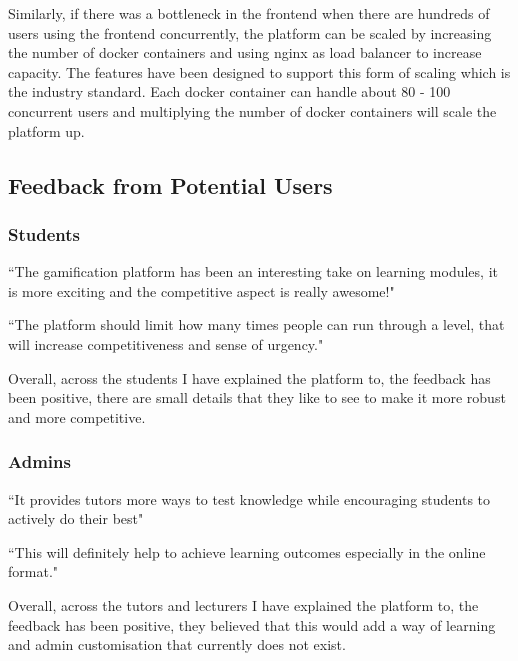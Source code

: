 Similarly, if there was a bottleneck in the frontend when there are hundreds of users using the frontend concurrently, the platform can be scaled by increasing the number of docker containers and using nginx as load balancer to increase capacity. The features have been designed to support this form of scaling which is the industry standard. Each docker container can handle about 80 - 100 concurrent users and multiplying the number of docker containers will scale the platform up.

\subsection{Feedback from Potential Users}
\subsubsection{Students}

``The gamification platform has been an interesting take on learning modules, it is more exciting and the competitive aspect is really awesome!"

``The platform should limit how many times people can run through a level, that will increase competitiveness and sense of urgency."

Overall, across the students I have explained the platform to, the feedback has been positive, there are small details that they like to see to make it more robust and more competitive.

\subsubsection{Admins}

``It provides tutors more ways to test knowledge while encouraging students to actively do their best"

``This will definitely help to achieve learning outcomes especially in the online format."

Overall, across the tutors and lecturers I have explained the platform to, the feedback has been positive, they believed that this would add a way of learning and admin customisation that currently does not exist.

\newpage